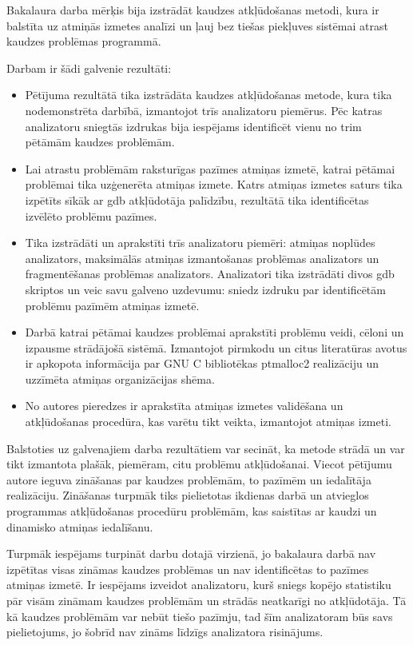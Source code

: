 ﻿Bakalaura darba mērķis bija izstrādāt kaudzes atkļūdošanas metodi, kura ir balstīta uz atmiņās izmetes analīzi un ļauj bez tiešas piekļuves sistēmai atrast kaudzes problēmas programmā.

Darbam ir šādi galvenie rezultāti:
\begin{itemize}
    \item Pētījuma rezultātā tika izstrādāta kaudzes atkļūdošanas metode, kura tika nodemonstrēta darbībā, izmantojot trīs analizatoru piemērus.
    Pēc katras analizatoru sniegtās izdrukas bija iespējams identificēt vienu no trim pētāmām kaudzes problēmām.
    \item Lai atrastu problēmām raksturīgas pazīmes atmiņas izmetē, katrai pētāmai problēmai tika uzģenerēta atmiņas izmete.
    Katrs atmiņas izmetes saturs tika izpētīts sīkāk ar gdb atkļūdotāja palīdzību, rezultātā tika identificētas izvēlēto problēmu pazīmes.
    \item Tika izstrādāti un aprakstīti trīs analizatoru piemēri: atmiņas noplūdes analizators, maksimālās atmiņas izmantošanas problēmas analizators un fragmentēšanas problēmas analizators.
    Analizatori tika izstrādāti divos gdb skriptos un veic savu galveno uzdevumu: sniedz izdruku par identificētām problēmu pazīmēm atmiņas izmetē. 
    \item Darbā katrai pētāmai kaudzes problēmai aprakstīti problēmu veidi, cēloni un izpausme strādājošā sistēmā. 
    Izmantojot pirmkodu un citus literatūras avotus ir apkopota informācija par GNU C bibliotēkas ptmalloc2 realizāciju un uzzīmēta atmiņas organizācijas shēma. 
    \item No autores pieredzes ir aprakstīta atmiņas izmetes validēšana un atkļūdošanas procedūra, kas varētu tikt veikta, izmantojot atmiņas izmeti.
\end{itemize}

Balstoties uz galvenajiem darba rezultātiem var secināt, ka metode strādā un var tikt izmantota plašāk, piemēram, citu problēmu atkļūdošanai.
Viecot pētījumu autore ieguva zināšanas par kaudzes problēmām, to pazīmēm un iedalītāja realizāciju.
Zināšanas turpmāk tiks pielietotas ikdienas darbā un atvieglos programmas atkļūdošanas procedūru problēmām, kas saistītas ar kaudzi un dinamisko atmiņas iedalīšanu. 

Turpmāk iespējams turpināt darbu dotajā virzienā, jo bakalaura darbā nav izpētītas visas zināmas kaudzes problēmas un nav identificētas to pazīmes atmiņas izmetē.
Ir iespējams izveidot analizatoru, kurš sniegs kopējo statistiku pār visām zināmam kaudzes problēmām un strādās neatkarīgi no atkļūdotāja. 
Tā kā kaudzes problēmām var nebūt tiešo pazīmju, tad šīm analizatoram būs savs pielietojums, jo šobrīd nav zināms līdzīgs analizatora risinājums.
